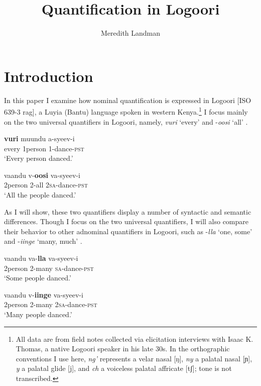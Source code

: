 \documentclass[output=paper]{langsci/langscibook}
\title{Quantification in Logoori}
\author{%
 Meredith Landman \affiliation{Pomona College} 
}
\begin{document}
 
 

\section{Introduction}

In this paper I examine how nominal quantification is expressed in Logoori [ISO 639-3
{rag}], a Luyia (Bantu) language spoken in western Kenya.\footnote{All data are from field notes collected via elicitation interviews with Isaac K. Thomas, a native Logoori speaker in his late 30s. In the orthographic conventions I use here, \textit{ng'} represents a velar nasal [ŋ], \textit{ny} a palatal nasal [ɲ], \textit{y} a palatal glide [j], and \textit{ch} a voiceless palatal affricate [tʃ]; tone is not transcribed.
} I focus mainly on the two universal quantifiers in Logoori, namely, \textit{vuri} ‘every’  and -\textit{oosi} ‘all’ .

\ea\label{ex:landman:1}
\ea\label{ex:landman:1a}
\gll \textbf{vuri}  muundu  a-syeev-i\\
     every  1person  1-dance-\textsc{pst}\\
\glt ‘Every person danced.’

\ex\label{ex:landman:1b}
\gll   vaandu  v-\textbf{oosi}    va-syeev-i\\
     2person  2-all    2\textsc{sa}-dance-\textsc{pst}\\
\glt ‘All the people danced.’
\z
\z

As I will show, these two quantifiers display a number of syntactic and semantic differences. Though I focus on the two universal quantifiers, I will also compare their behavior to other adnominal quantifiers in Logoori, such as -\textit{lla} ‘one, some’  and -\textit{iinge} ‘many, much’ .


\ea\label{ex:landman:2} 
\ea\label{ex:landman:2a} 
\gll   vaandu  va-\textbf{lla}    va-syeev-i\\
       2person	2-many            \textsc{sa}-dance-\textsc{pst}\\
\glt ‘Some people danced.’


\ex\label{ex:landman:2b} 
 \gll vaandu  v-\textbf{iinge}  va-syeev-i\\
     2person  2-many  2\textsc{sa}-dance-\textsc{pst}\\
\glt ‘Many people danced.’\\
\z
\z
\end{document}

